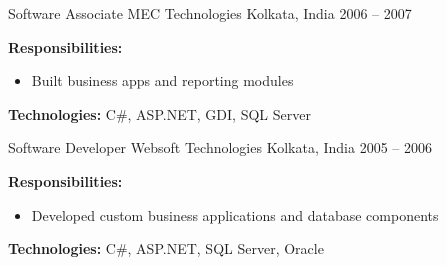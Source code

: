 \begin{cventries}
\cventry
  {Software Associate}
  {MEC Technologies}
  {Kolkata, India}
  {2006 – 2007}
  {
    \begin{cvitems}
      \item {\textbf{Responsibilities:}
        \begin{itemize}
          \item Built business apps and reporting modules\\
        \end{itemize}
      }
      \item {\textbf{Technologies:} C\#, ASP.NET, GDI, SQL Server}\\
    \end{cvitems}
  }

\cventry
  {Software Developer}
  {Websoft Technologies}
  {Kolkata, India}
  {2005 – 2006}
  {
    \begin{cvitems}
      \item {\textbf{Responsibilities:}
        \begin{itemize}
          \item Developed custom business applications and database components\\
        \end{itemize}
      }
      \item {\textbf{Technologies:} C\#, ASP.NET, SQL Server, Oracle}\\\\
    \end{cvitems}
  }

\end{cventries}
